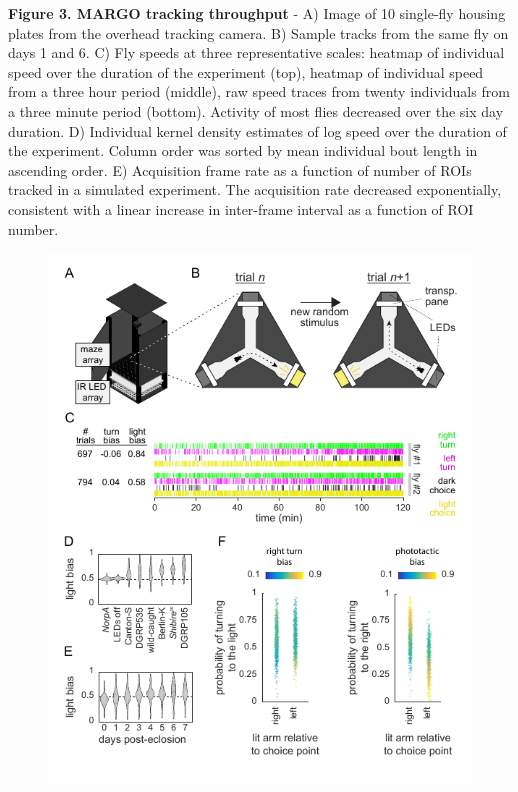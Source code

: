 \documentclass[10pt,letterpaper]{article}
\begin{document}
\clearpage
\textbf{Figure 3. MARGO tracking throughput} - A) Image of 10 single-fly housing plates from the overhead tracking camera. B) Sample tracks from the same fly on days 1 and 6. C) Fly speeds at three representative scales: heatmap of individual speed over the duration of the experiment (top), heatmap of individual speed from a three hour period (middle), raw speed traces from twenty individuals from a three minute period (bottom). Activity of most flies decreased over the six day duration. D) Individual kernel density estimates of log speed over the duration of the experiment. Column order was sorted by mean individual bout length in ascending order. E) Acquisition frame rate as a function of number of ROIs tracked in a simulated experiment. The acquisition rate decreased exponentially, consistent with a linear increase in inter-frame interval as a function of ROI number.

\clearpage
\begin{figure}
	\includegraphics[width=\linewidth]{../../figures/LED_ymaze_panel_sm.pdf}
\end{figure}
\end{document}
